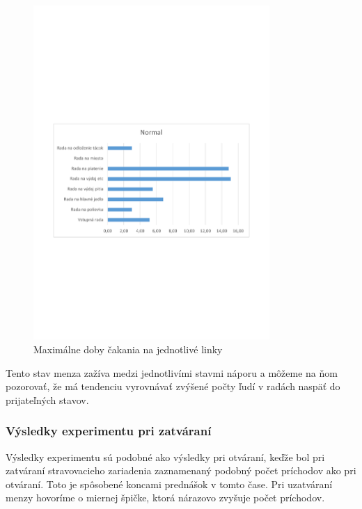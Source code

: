 \documentclass{article}
\begin{document}
\begin{figure}[h!]
  \centering
  \includegraphics[width=0.8\textwidth,keepaspectratio]{experiment_3.pdf}
  \caption{Maximálne doby čakania na jednotlivé linky}
  \label{fig:experiment_3}
\end{figure}


Tento stav menza zažíva medzi jednotlivími stavmi náporu a môžeme na ňom pozorovať, že má tendenciu vyrovnávať zvýšené počty ľudí v radách naspäť do prijateľných stavov.

\pagebreak
\subsubsection{Výsledky experimentu pri zatváraní}
Výsledky experimentu sú podobné ako výsledky pri otváraní, keďže bol pri zatváraní stravovacieho zariadenia zaznamenaný podobný počet príchodov ako pri otváraní. Toto je spôsobené koncami prednášok v tomto čase. Pri uzatváraní menzy hovoríme o miernej špičke, ktorá nárazovo zvyšuje počet príchodov.
\end{document}
